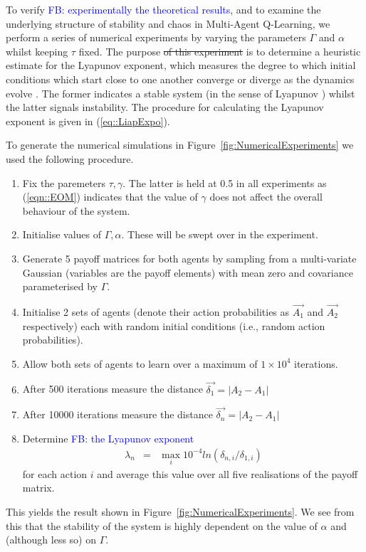\documentclass[sigconf]{aamas}
\newcommand\fb[1]{\textcolor{blue}{FB: #1}}
\begin{document}
To verify \fb{experimentally the theoretical results}, and to examine the underlying structure of stability and chaos in
Multi-Agent Q-Learning, we perform a series of numerical experiments by varying the parameters $\Gamma$ and
$\alpha$ whilst keeping $\tau$ fixed. The purpose 
\st{of this experiment} is to determine a heuristic estimate for the Lyapunov exponent, which measures the degree to which initial conditions which start close to one another converge or diverge as the dynamics evolve \cite{Strogatz2000}. The former indicates a stable system (in the sense of Lyapunov \cite{}) whilst the latter signals instability. The procedure for calculating the Lyapunov exponent is given in (\ref{eq::LiapExpo}).


To generate the numerical simulations in Figure~\ref{fig:NumericalExperiments} we used the
following procedure.
\begin{enumerate}
   \item Fix the paremeters $\tau, \gamma$. The latter is held at 0.5 in all experiments as (\ref{eqn::EOM}) indicates that the value of $\gamma$ does not affect the overall behaviour of the system.
   \item Initialise values of $\Gamma, \alpha$. These will be swept over in the experiment.
\item Generate 5 payoff matrices for both agents by sampling from a multi-variate Gaussian 
(variables are the payoff elements) with mean zero and covariance parameterised by $\Gamma$.
\item Initialise 2 sets of agents (denote their action probabilities as $\Vec{A_1}$ and $\Vec{A_2}$ respectively) each with random initial conditions (i.e., random action probabilities).
\item Allow both sets of agents to learn over a maximum of $1 \times 10^4$ iterations.
\item After 500 iterations measure the distance $\Vec{\delta_1} = |A_2 - A_1|$
\item After 10000 iterations measure the distance $\Vec{\delta_n} = |A_2 - A_1|$
\item Determine \fb{the Lyapunov exponent} 
\begin{eqnarray*}
\label{eq::LiapExpo}
    \lambda_n & = & \max_{i} 10^{-4} ln(\delta_{n, i}/\delta_{1, i})
\end{eqnarray*}
for each action $i$ and average this value over all five realisations of the payoff matrix. 
\end{enumerate}
   
This yields the result shown in Figure~\ref{fig:NumericalExperiments}. We see from this that the stability of the system is highly dependent on
the value of $\alpha$ and (although less so) on $\Gamma$.
   
\end{document}
